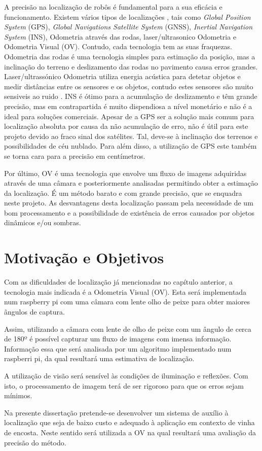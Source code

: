 A precisão na localização de robôs é fundamental para a sua eficácia e funcionamento. Existem vários tipos de localizações , tais como \textit{Global Position System} (GPS), \textit{Global Navigations Satellite System} (GNSS), \textit{Inertial Navigation System} (INS), Odometria através das rodas, laser/ultrasonico Odometria e Odometria Visual (OV). Contudo, cada tecnologia tem as suas fraquezas. Odometria das rodas é uma tecnologia simples para estimação da posição, mas a inclinação do terreno e deslizamento das rodas no pavimento causa erros grandes. Laser/ultrassónico  Odometria utiliza energia acústica para detetar objetos e medir distâncias entre os sensores e os objetos, contudo estes sensores são muito sensiveis ao ruido . INS é ótimo para a acumulação de deslizamento e têm grande precisão, mas em contrapartida é muito dispendiosa a nível monetário e não é a ideal para soluções comerciais. Apesar de a GPS  ser a solução mais comum para localização absoluta por causa da não acumulação de erro, não é útil para este projeto devido ao fraco sinal dos satélites. Tal, deve-se à inclinação dos terrenos e possibilidades de céu nublado. Para além disso, a utilização de GPS este também se torna cara para a precisão em centímetros. \cite{Aqel2016}

Por último, OV é uma tecnologia que envolve um fluxo de imagens adquiridas através de uma câmara e posteriormente analisadas permitindo obter a estimação da localização. É um método barato e com grande precisão, que se enquadra neste projeto. As desvantagens desta localização passam pela necessidade de um bom processamento e a possibilidade de existência de erros causados por objetos dinâmicos e/ou sombras.

\section{Motivação e Objetivos} \label{sec:context}

Com as dificuldades de localização já mencionadas no capítulo anterior, a tecnologia mais indicada é a Odometria Visual (OV). Esta será implementada num raspberry pi com uma câmara com lente olho de peixe para obter maiores ângulos de captura.

Assim, utilizando a câmara com lente de olho de peixe com um ângulo de cerca de 180º é possível capturar um fluxo de imagens com imensa informação. Informação essa que será analisada por um algoritmo implementado num raspberri pi, da qual resultará uma estimativa de localização.

A utilização de visão será sensível às condições de iluminação e reflexões. Com isto, o processamento de imagem terá de ser rigoroso para que os erros sejam mínimos.

Na presente dissertação pretende-se desenvolver um sistema de auxílio à localização que seja de baixo custo e adequado à aplicação em contexto de vinha de encosta. Neste sentido será utilizada a OV na qual resultará uma avaliação da precisão do método.


